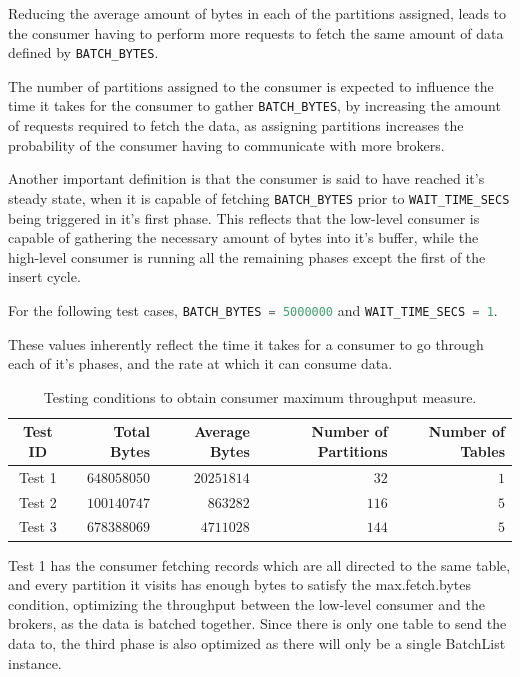 Reducing the average amount of bytes in each of the partitions assigned, leads
to the consumer having to perform more requests to fetch the same amount of data
defined by \lstinline[language=Python]{BATCH_BYTES}. 

The number of partitions assigned to the consumer is expected to influence the
time it takes for the consumer to gather
\lstinline[language=Python]{BATCH_BYTES}, by increasing the amount of requests
required to fetch the data, as assigning partitions increases the probability of
the consumer having to communicate with more brokers. 

Another important definition is that the consumer is said to have reached it's
steady state, when it is capable of fetching
\lstinline[language=Python]{BATCH_BYTES} prior to
\lstinline[language=Python]{WAIT_TIME_SECS} being triggered in it's first phase.
This reflects that the low-level consumer is capable of gathering the necessary
amount of bytes into it's buffer, while the high-level consumer is running all
the remaining phases except the first of the insert cycle.

For the following test cases, \lstinline[language=Python]{BATCH_BYTES = 5000000}
and \lstinline[language=Python]{WAIT_TIME_SECS = 1}.

These values inherently reflect the time it takes for a consumer to go through
each of it's phases, and the rate at which it can consume data.

\begin{table}[H] \centering \caption{Testing conditions to obtain consumer
    maximum throughput measure.} \begin{tabular}{ |c|r|r|r|r| } \hline
        \textbf{Test ID} & \textbf{Total Bytes} & \textbf{Average Bytes} &
        \textbf{Number of Partitions} & \textbf{Number of Tables} \\ \hline Test
    1 & $648058050$ & $20251814$ & $32$ & $1$ \\ Test 2 & $100140747$ & $863282$
    & $116$ & $5$ \\ Test 3 & $678388069$ & $4711028$ & $144$ & $5$ \\ \hline
    \end{tabular} \end{table}

Test 1 has the consumer fetching records which are all directed to the same
    table, and every partition it visits has enough bytes to satisfy the
    max.fetch.bytes condition, optimizing the throughput between the low-level
    consumer and the brokers, as the data is batched together. Since there is
    only one table to send the data to, the third phase is also optimized as
    there will only be a single BatchList instance.

